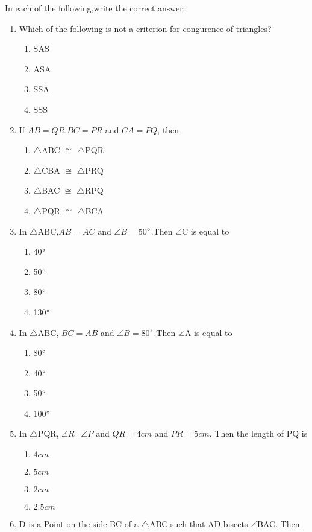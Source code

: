 \documentclass{article}
\begin{document}
In each of the following,write the correct answer:

\begin{enumerate}
\item Which of the following is not a criterion for congurence of triangles?
\begin{enumerate} 
\item SAS
\item ASA
\item SSA
\item SSS
\end{enumerate}
\item If $AB=QR$,$BC=PR$ and $CA=PQ$, then
\begin{enumerate}
\item $\triangle$ABC $\cong$ $\triangle$PQR
\item $\triangle$CBA $\cong$ $\triangle$PRQ
\item $\triangle$BAC $\cong$ $\triangle$RPQ
\item $\triangle$PQR $\cong$ $\triangle$BCA
\end{enumerate}
\item In $\triangle$ABC,$AB=AC$ and $\angle$$B=50$$\degree$.Then $\angle$C is equal to
\begin{enumerate}
\item 40$\degree$
\item 50$\degree$
\item 80$\degree$
\item 130$\degree$
\end{enumerate}
\item In $\triangle$ABC, $BC=AB$ and $\angle$$B=80$$\degree$.Then $\angle$A is equal to
\begin{enumerate}
\item 80$\degree$
\item 40$\degree$
\item 50$\degree$
\item 100$\degree$
\end{enumerate}
\item In $\triangle$PQR, $\angle$$R$=$\angle$$P$ and $QR=4cm$ and $PR=5cm$. Then the length of PQ is
\begin{enumerate}
\item $4cm$
\item $5cm$
\item $2cm$
\item $2.5cm$
\end{enumerate}
\item D is a Point on the side BC of a $\triangle$ABC such that AD bisects $\angle$BAC. Then

\end{enumerate}
\end{document}
